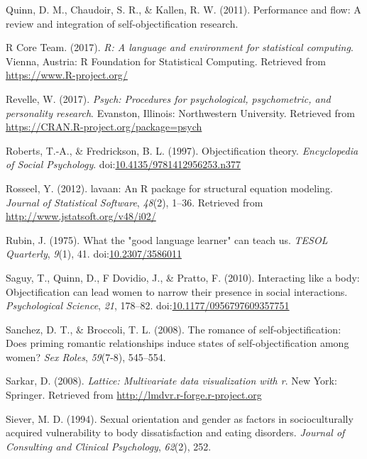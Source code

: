 \documentclass[
  man]{apa6}
\begin{document}
\leavevmode\hypertarget{ref-quinn2011performance}{}%
Quinn, D. M., Chaudoir, S. R., \& Kallen, R. W. (2011). Performance and flow: A review and integration of self-objectification research.

\leavevmode\hypertarget{ref-R-base}{}%
R Core Team. (2017). \emph{R: A language and environment for statistical computing}. Vienna, Austria: R Foundation for Statistical Computing. Retrieved from \url{https://www.R-project.org/}

\leavevmode\hypertarget{ref-R-psych}{}%
Revelle, W. (2017). \emph{Psych: Procedures for psychological, psychometric, and personality research}. Evanston, Illinois: Northwestern University. Retrieved from \url{https://CRAN.R-project.org/package=psych}

\leavevmode\hypertarget{ref-robertsfredrickson}{}%
Roberts, T.-A., \& Fredrickson, B. L. (1997). Objectification theory. \emph{Encyclopedia of Social Psychology}. doi:\href{https://doi.org/10.4135/9781412956253.n377}{10.4135/9781412956253.n377}

\leavevmode\hypertarget{ref-R-lavaan}{}%
Rosseel, Y. (2012). lavaan: An R package for structural equation modeling. \emph{Journal of Statistical Software}, \emph{48}(2), 1--36. Retrieved from \url{http://www.jstatsoft.org/v48/i02/}

\leavevmode\hypertarget{ref-rubin1975}{}%
Rubin, J. (1975). What the "good language learner" can teach us. \emph{TESOL Quarterly}, \emph{9}(1), 41. doi:\href{https://doi.org/10.2307/3586011}{10.2307/3586011}

\leavevmode\hypertarget{ref-saguyetal2010}{}%
Saguy, T., Quinn, D., F Dovidio, J., \& Pratto, F. (2010). Interacting like a body: Objectification can lead women to narrow their presence in social interactions. \emph{Psychological Science}, \emph{21}, 178--82. doi:\href{https://doi.org/10.1177/0956797609357751}{10.1177/0956797609357751}

\leavevmode\hypertarget{ref-sanchez2008romance}{}%
Sanchez, D. T., \& Broccoli, T. L. (2008). The romance of self-objectification: Does priming romantic relationships induce states of self-objectification among women? \emph{Sex Roles}, \emph{59}(7-8), 545--554.

\leavevmode\hypertarget{ref-R-lattice}{}%
Sarkar, D. (2008). \emph{Lattice: Multivariate data visualization with r}. New York: Springer. Retrieved from \url{http://lmdvr.r-forge.r-project.org}

\leavevmode\hypertarget{ref-siever1994sexual}{}%
Siever, M. D. (1994). Sexual orientation and gender as factors in socioculturally acquired vulnerability to body dissatisfaction and eating disorders. \emph{Journal of Consulting and Clinical Psychology}, \emph{62}(2), 252.
\end{document}
